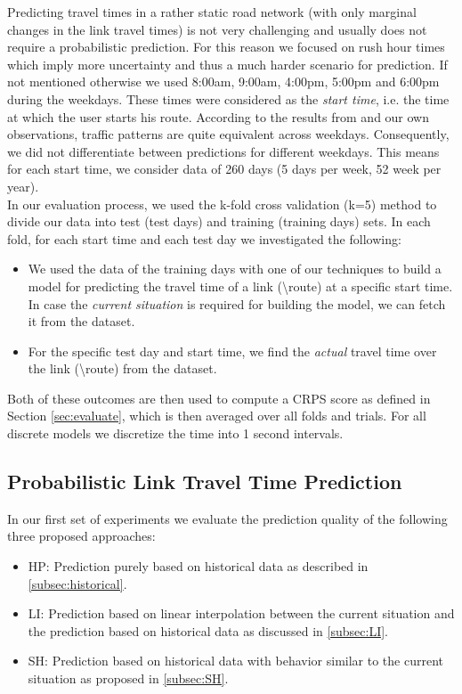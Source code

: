 Predicting travel times in a rather static road network (with only marginal changes in the link travel times) is not very challenging and usually does not require a probabilistic prediction. For this reason we focused on rush hour times which imply more uncertainty and thus a much harder scenario for prediction. If not mentioned otherwise we used 8:00am, 9:00am, 4:00pm, 5:00pm and 6:00pm during the weekdays. These times were considered as the \textit{start time}, i.e. the time at which the user starts his route. According to the results from \cite{Pan12} and our own observations, traffic patterns are quite equivalent across weekdays. Consequently, we did not differentiate between predictions for different weekdays. This means for each start time, we consider data of 260 days (5 days per week, 52 week per year). \\
In our evaluation process, we used the k-fold cross validation (k=5) method to divide our data into test (test days) and training (training days) sets. In each fold, for each start time and each test day we investigated the following:
\begin{itemize}
  \item We used the data of the training days with one of our techniques to build a model for predicting the travel time of a link (\textbackslash route) at a specific start time. In case the \textit{current situation} is required for building the model, we can fetch it from the dataset.
  \item For the specific test day and start time, we find the \textit{actual} travel time over the link (\textbackslash route) from the dataset.
\end{itemize}
Both of these outcomes are then used to compute a CRPS score as defined in Section \ref{sec:evaluate}, which is then averaged over all folds and trials. For all discrete models we discretize the time into 1 second intervals.

\subsection{Probabilistic Link Travel Time Prediction}
\label{subsec:pltt_prediction}
In our first set of experiments we evaluate the prediction quality of the following three proposed approaches:
\begin{itemize}
  \item HP: Prediction purely based on historical data as described in \cref{subsec:historical}.
  \item LI: Prediction based on linear interpolation between the current situation and the prediction based on historical data as discussed in \cref{subsec:LI}.
  \item SH: Prediction based on historical data with behavior similar to the current situation as proposed in \cref{subsec:SH}.
\end{itemize}


